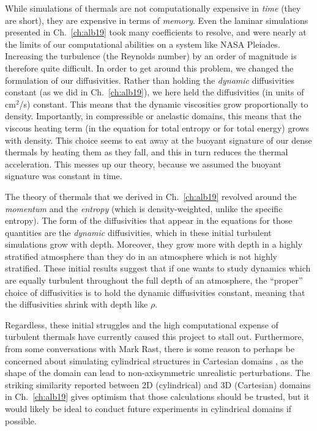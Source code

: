 While simulations of thermals are not computationally expensive in \emph{time} (they are short), they are expensive in terms of \emph{memory}.
Even the laminar simulations presented in Ch.~\ref{ch:alb19} took many coefficients to resolve, and were nearly at the limits of our computational abilities on a system like NASA Pleiades.
Increasing the turbulence (the Reynolds number) by an order of magnitude is therefore quite difficult.
In order to get around this problem, we changed the formulation of our diffusivities.
Rather than holding the \emph{dynamic} diffusivities constant (as we did in Ch.~\ref{ch:alb19}), we here held the diffusivities (in units of cm$^2$/s) constant.
This means that the dynamic viscosities grow proportionally to density.
Importantly, in compressible or anelastic domains, this means that the viscous heating term (in the equation for total entropy or for total energy) grows with density.
This choice seems to eat away at the buoyant signature of our dense thermals by heating them as they fall, and this in turn reduces the thermal acceleration.
This messes up our theory, because we assumed the buoyant signature was constant in time.

The theory of thermals that we derived in Ch.~\ref{ch:alb19} revolved around the \emph{momentum} and the \emph{entropy} (which is density-weighted, unlike the specific entropy).
The form of the diffusivities that appear in the equations for those quantities are the \emph{dynamic} diffusivities, which in these initial turbulent simulations grow with depth.
Moreover, they grow more with depth in a highly stratified atmosphere than they do in an atmosphere which is not highly stratified.
These initial results suggest that if one wants to study dynamics which are equally turbulent throughout the full depth of an atmosphere, the ``proper'' choice of diffusivities is to hold the dynamic diffusivities constant, meaning that the diffusivities shrink with depth like $\rho$.

Regardless, these initial struggles and the high computational expense of turbulent thermals have currently caused this project to stall out.
Furthermore, from some conversations with Mark Rast, there is some reason to perhaps be concerned about simulating cylindrical structures in Cartesian domains \citep[see e.g., Fig.~9 of][]{clyne&all2007}, as the shape of the domain can lead to non-axisymmetric unrealistic perturbations.
The striking similarity reported between 2D (cylindrical) and 3D (Cartesian) domains in Ch.~\ref{ch:alb19} gives optimism that those calculations should be trusted, but it would likely be ideal to conduct future experiments in cylindrical domains if possible.


